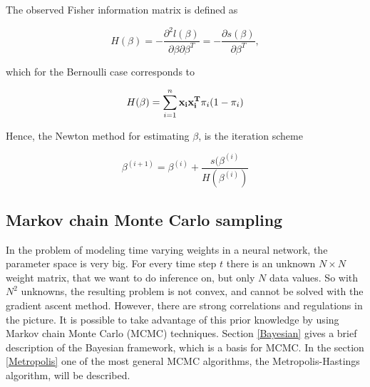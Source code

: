 The observed Fisher information matrix is defined as 

\begin{equation}
    H(\beta) = - \frac{\partial^2 l(\beta)}{\partial \beta \partial \beta^T} = -\frac{\partial s(\beta)}{\partial \beta^T},
\end{equation}

which for the Bernoulli case corresponds to

\begin{equation}
    H(\beta) = \sum_{i=1}^{n} {\bf x_i x_i^T} \pi_i (1-\pi_i)
\end{equation}

Hence, the Newton method for estimating $\beta$, is the iteration scheme

\begin{equation}
    \beta^{(i+1)} = \beta^{(i)} + \frac{s(\beta^{(i)}}{H(\beta^{(i)})}
\end{equation}










\subsection{Markov chain Monte Carlo sampling}
In the problem of modeling time varying weights in a neural network, the parameter space is very big. For every time step $t$ there is an unknown $N \times N$ weight matrix, that we want to do inference on, but only $N$ data values. So with $N^2$ unknowns, the resulting problem is not convex, and cannot be solved with the gradient ascent method. However, there are strong correlations and regulations in the picture. It is possible to take advantage of this prior knowledge by using Markov chain Monte Carlo (MCMC) techniques. Section \ref{Bayesian} gives a brief description of the Bayesian framework, which is a basis for MCMC. In the section \ref{Metropolis} one of the most general MCMC algorithms, the  Metropolis-Hastings algorithm, will be described. 
